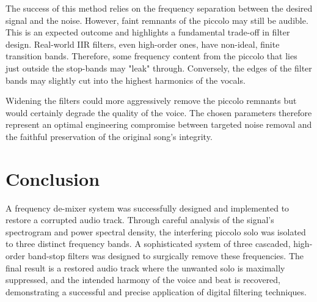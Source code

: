 \documentclass[11pt, a4paper]{article}
\begin{document}
The success of this method relies on the frequency separation between the desired signal and the noise. However, faint remnants of the piccolo may still be audible. This is an expected outcome and highlights a fundamental trade-off in filter design. Real-world IIR filters, even high-order ones, have non-ideal, finite transition bands. Therefore, some frequency content from the piccolo that lies just outside the stop-bands may "leak" through. Conversely, the edges of the filter bands may slightly cut into the highest harmonics of the vocals.

Widening the filters could more aggressively remove the piccolo remnants but would certainly degrade the quality of the voice. The chosen parameters therefore represent an optimal engineering compromise between targeted noise removal and the faithful preservation of the original song's integrity.

\section{Conclusion}
A frequency de-mixer system was successfully designed and implemented to restore a corrupted audio track. Through careful analysis of the signal's spectrogram and power spectral density, the interfering piccolo solo was isolated to three distinct frequency bands. A sophisticated system of three cascaded, high-order band-stop filters was designed to surgically remove these frequencies. The final result is a restored audio track where the unwanted solo is maximally suppressed, and the intended harmony of the voice and beat is recovered, demonstrating a successful and precise application of digital filtering techniques.

\appendix
\end{document}
